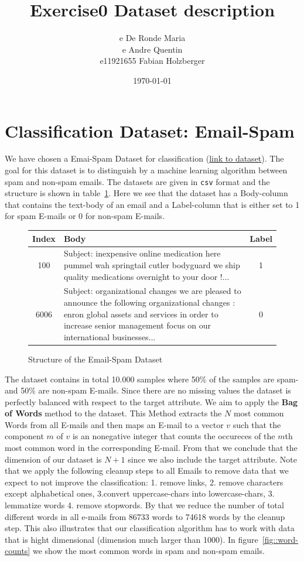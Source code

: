 \documentclass[11pt]{article}
\title{Exercise0 Dataset description}
\author{e De Ronde Maria \\ e Andre Quentin  \\ e11921655 Fabian Holzberger }
\date{\today}
\begin{document}
\graphicspath{{./figures/}}
\maketitle
\section{Classification Dataset: Email-Spam}
We have chosen a Emai-Spam Dataset for classification (\href{https://www.kaggle.com/nitishabharathi/email-spam-dataset?select=enronSpamSubset.csv}{link to dataset}). The goal for this dataset is to distinguish by a machine learning algorithm between  spam and non-spam emails. The datasets are given in \texttt{csv} format and the structure is shown in table~\ref{tab::0}. Here we see that the dataset has a Body-column that contains the text-body of an email and a Label-column that is either set to 1 for spam E-mails or 0 for non-spam E-mails. 

\begin{figure}[h]
  \begin{tabular}{ | c | p{13cm} | c |}
    \hline
    Index & Body & Label \\
    \hline
    100 & 
    Subject: inexpensive online medication here
 pummel wah springtail cutler bodyguard
 we ship quality medications overnight to your door !...
    & 1 \\ \hline
    6006
    &
    Subject: organizational changes
 we are pleased to announce the following organizational changes :
 enron global assets and services
 in order to increase senior management focus on our international businesses... 
    & 0 \\
    \hline
    \end{tabular}
    \caption{Structure of the Email-Spam Dataset}
    \label{tab::0}
  \end{figure}

The dataset contains in total 10.000 samples where 50\% of the samples are spam- and 50\% are non-spam E-mails. Since there are no missing values the dataset is perfectly balanced with respect to the target attribute. We aim to apply the \textbf{Bag of Words} method to the dataset. This Method extracts the $N$ most common Words from all E-mails and then maps an E-mail to a vector $v$ such that the component $m$ of $v$ is an nonegative integer that counts the occureces of the $m$th most common word in the corresponding E-mail. From that we conclude that the dimension of our dataset is $N+1$ since we also include the target attribute.  Note that we apply the following cleanup steps to all Emails to remove data that we expect to not improve the classification: 1. remove links, 2. remove characters except alphabetical ones, 3.convert uppercase-chars into lowercase-chars, 3. lemmatize words 4. remove stopwords. By that we reduce the number of total different words in all e-mails from 86733 words to 74618 words by the cleanup step. This also illustrates that our classification algorithm has to work with data that is hight dimensional (dimension much larger than 1000).          
In figure~\ref{fig::word-counts} we show the most common words in spam and non-spam emails.  
\end{document}

